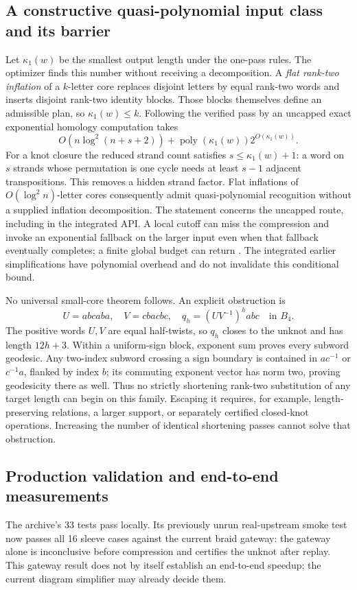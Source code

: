 \subsection{A constructive quasi-polynomial input class and its barrier}
Let $\kappa_1(w)$ be the smallest output length under the one-pass rules.
The optimizer finds this number without receiving a decomposition. A
\emph{flat rank-two inflation} of a $k$-letter core replaces disjoint
letters by equal rank-two words and inserts disjoint rank-two identity
blocks. Those blocks themselves define an admissible plan, so
$\kappa_1(w)\le k$. Following the verified pass by an uncapped exact
exponential homology computation takes
\[
 O(n\log^2(n+s+2))+
 \operatorname{poly}(\kappa_1(w))2^{O(\kappa_1(w))}.
\]
For a knot closure the reduced strand count satisfies
$s\le\kappa_1(w)+1$: a word on $s$ strands whose permutation is one cycle
needs at least $s-1$ adjacent transpositions. This removes a hidden strand
factor. Flat inflations of $O(\log^2 n)$-letter cores consequently admit
quasi-polynomial recognition without a supplied inflation decomposition.
The statement concerns the uncapped route, including
 in the integrated API. A local cutoff can
miss the compression and invoke an exponential fallback on the larger
input even when that fallback eventually completes; a finite global budget
can return . The integrated earlier simplifications have
polynomial overhead and do not invalidate this conditional bound.

No universal small-core theorem follows. An explicit obstruction is
\[
 U=abcaba,
 \quad V=cbacbc,
 \quad q_h=(UV^{-1})^h abc\quad\text{in }B_4.
\]
The positive words $U,V$ are equal half-twists, so $q_h$ closes to the
unknot and has length $12h+3$. Within a uniform-sign block, exponent sum
proves every subword geodesic. Any two-index subword crossing a sign
boundary is contained in $ac^{-1}$ or $c^{-1}a$, flanked by index $b$;
its commuting exponent vector has norm two, proving geodesicity there
as well. Thus no strictly shortening rank-two substitution of any target
length can begin on this family. Escaping it requires, for example,
length-preserving relations, a larger support, or separately certified
closed-knot operations. Increasing the number of identical shortening
passes cannot solve that obstruction.

\subsection{Production validation and end-to-end measurements}
The archive's 33 tests pass locally. Its previously unrun real-upstream
smoke test now passes all 16 sleeve cases against the current braid gateway:
the gateway alone is inconclusive before compression and certifies the
unknot after replay. This gateway result does not by itself establish an
end-to-end speedup; the current diagram simplifier may already decide them.

